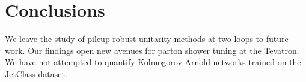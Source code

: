 \section{Conclusions}\label{sec:conclusions}

We leave the study of pileup-robust unitarity methods at two loops to
future work. Our findings open new avenues for parton shower tuning at
the Tevatron. We have not attempted to quantify Kolmogorov-Arnold
networks trained on the JetClass dataset.

